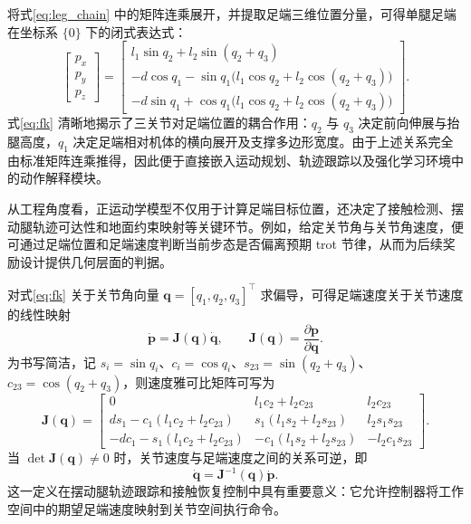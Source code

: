 \documentclass[12pt,a4paper]{ctexart}
\numberwithin{equation}{section}
\numberwithin{table}{section}
\numberwithin{figure}{section}
\newcommand{\subtopic}[1]{\par\addvspace{0.2\baselineskip}\ignorespaces}
\begin{document}
\subtopic{正运动学分析}
将式\eqref{eq:leg_chain} 中的矩阵连乘展开，并提取足端三维位置分量，可得单腿足端在坐标系 $\{0\}$ 下的闭式表达式：
\begin{equation}
\begin{bmatrix}
p_x\\ p_y\\ p_z
\end{bmatrix}
=
\begin{bmatrix}
l_1\sin q_2 + l_2\sin(q_2+q_3)\\
-d\cos q_1 - \sin q_1\bigl(l_1\cos q_2 + l_2\cos(q_2+q_3)\bigr)\\
-d\sin q_1 + \cos q_1\bigl(l_1\cos q_2 + l_2\cos(q_2+q_3)\bigr)
\end{bmatrix}.
\label{eq:fk}
\end{equation}
式\eqref{eq:fk} 清晰地揭示了三关节对足端位置的耦合作用：$q_2$ 与 $q_3$ 决定前向伸展与抬腿高度，$q_1$ 决定足端相对机体的横向展开及支撑多边形宽度。由于上述关系完全由标准矩阵连乘推得，因此便于直接嵌入运动规划、轨迹跟踪以及强化学习环境中的动作解释模块。

从工程角度看，正运动学模型不仅用于计算足端目标位置，还决定了接触检测、摆动腿轨迹可达性和地面约束映射等关键环节。例如，给定关节角与关节角速度，便可通过足端位置和足端速度判断当前步态是否偏离预期 trot 节律，从而为后续奖励设计提供几何层面的判据。

\subtopic{雅可比矩阵计算}
对式\eqref{eq:fk} 关于关节角向量 $\bm{q}=[q_1,q_2,q_3]^\top$ 求偏导，可得足端速度关于关节速度的线性映射
\begin{equation}
\dot{\bm{p}}=\bm{J}(\bm{q})\dot{\bm{q}},\qquad
\bm{J}(\bm{q})=\frac{\partial \bm{p}}{\partial \bm{q}}.
\end{equation}
为书写简洁，记 $s_i=\sin q_i$、$c_i=\cos q_i$、$s_{23}=\sin(q_2+q_3)$、$c_{23}=\cos(q_2+q_3)$，则速度雅可比矩阵可写为
\begin{equation}
\bm{J}(\bm{q})=
\begin{bmatrix}
0 & l_1 c_2 + l_2 c_{23} & l_2 c_{23}\\
d s_1 - c_1(l_1 c_2 + l_2 c_{23}) & s_1(l_1 s_2 + l_2 s_{23}) & l_2 s_1 s_{23}\\
-d c_1 - s_1(l_1 c_2 + l_2 c_{23}) & -c_1(l_1 s_2 + l_2 s_{23}) & -l_2 c_1 s_{23}
\end{bmatrix}.
\label{eq:jacobian}
\end{equation}
当 $\det\bm{J}(\bm{q})\neq 0$ 时，关节速度与足端速度之间的关系可逆，即
\begin{equation}
\dot{\bm{q}}=\bm{J}^{-1}(\bm{q})\dot{\bm{p}}.
\end{equation}
这一定义在摆动腿轨迹跟踪和接触恢复控制中具有重要意义：它允许控制器将工作空间中的期望足端速度映射到关节空间执行命令。
\end{document}
